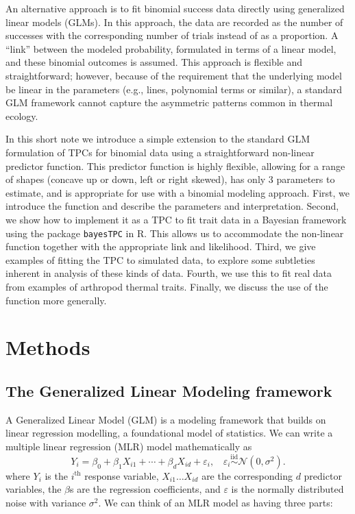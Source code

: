 \documentclass[
  11pt,
  letterpaper,
]{article}
\begin{document}
An alternative approach is to fit binomial success data directly using
generalized linear models (GLMs). In this approach, the data are
recorded as the number of successes with the corresponding number of
trials instead of as a proportion. A ``link'' between the modeled
probability, formulated in terms of a linear model, and these binomial
outcomes is assumed. This approach is flexible and straightforward;
however, because of the requirement that the underlying model be linear
in the parameters (e.g., lines, polynomial terms or similar), a standard
GLM framework cannot capture the asymmetric patterns common in thermal
ecology.

In this short note we introduce a simple extension to the standard GLM
formulation of TPCs for binomial data using a straightforward non-linear
predictor function. This predictor function is highly flexible, allowing
for a range of shapes (concave up or down, left or right skewed), has
only 3 parameters to estimate, and is appropriate for use with a
binomial modeling approach. First, we introduce the function and
describe the parameters and interpretation. Second, we show how to
implement it as a TPC to fit trait data in a Bayesian framework using
the package \texttt{bayesTPC} in R. This allows us to accommodate the
non-linear function together with the appropriate link and likelihood.
Third, we give examples of fitting the TPC to simulated data, to explore
some subtleties inherent in analysis of these kinds of data. Fourth, we
use this to fit real data from examples of arthropod thermal traits.
Finally, we discuss the use of the function more generally.

\section{Methods}\label{methods}

\subsection{The Generalized Linear Modeling
framework}\label{the-generalized-linear-modeling-framework}

A Generalized Linear Model (GLM) is a modeling framework that builds on
linear regression modelling, a foundational model of statistics. We can
write a multiple linear regression (MLR) model mathematically as \[
Y_i   = \beta_0 + \beta_1 X_{i1} + \cdots
+ \beta_d X_{id}  + \varepsilon_i, ~~~~  \varepsilon_i \stackrel{\mathrm{iid}}{\sim} \mathcal{N}(0, \sigma^2).
\] where \(Y_i\) is the \(i^{\mathrm{th}}\) response variable,
\(X_{i1} \dots X_{id}\) are the corresponding \(d\) predictor variables,
the \(\beta\)s are the regression coefficients, and \(\varepsilon\) is
the normally distributed noise with variance \(\sigma^2\). We can think
of an MLR model as having three parts:
\end{document}
